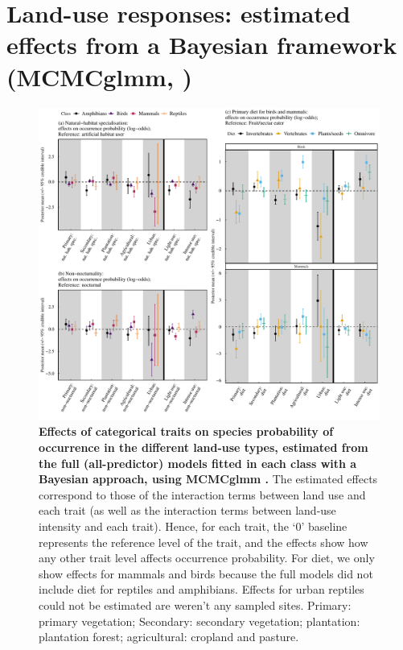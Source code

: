 \documentclass[11pt]{article}
\begin{document}
\clearpage

\section{Land-use responses: estimated effects from a Bayesian framework (MCMCglmm, \citep{MCMCglmm})} 


\begin{figure}[h!]
\centering
\includegraphics[scale=0.6]{Figures/MCMCglmm_Land_use_categorical_traits}
\caption[]{\textbf{Effects of categorical traits on species probability of occurrence in the different land-use types, estimated from the full (all-predictor) models fitted in each class with a Bayesian approach, using MCMCglmm \citep{MCMCglmm}.} The estimated effects correspond to those of the interaction terms between land use and each trait (as well as the interaction terms between land-use intensity and each trait). Hence, for each trait, the `0' baseline represents the reference level of the trait, and the effects show how any other trait level affects occurrence probability. For diet, we only show effects for mammals and birds because the full models did not include diet for reptiles and amphibians. Effects for urban reptiles could not be estimated are weren't any sampled sites. Primary: primary vegetation; Secondary: secondary vegetation; plantation: plantation forest; agricultural: cropland and pasture.}
\label{}
\end{figure}
\end{document}
